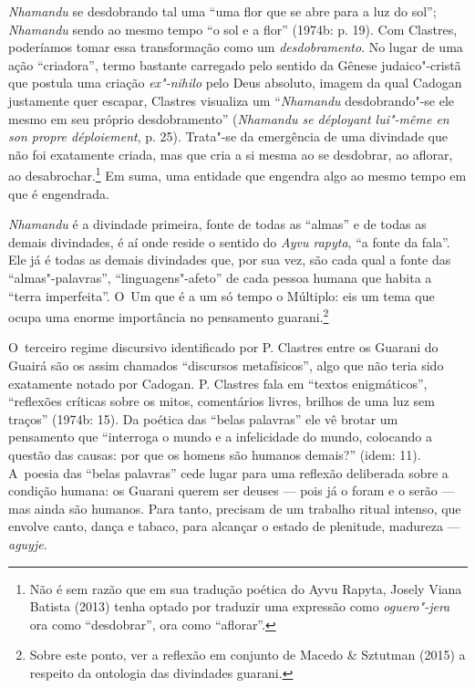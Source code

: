 \emph{Nhamandu} se desdobrando tal uma ``uma flor que se abre para a luz do
sol''; \emph{Nhamandu} sendo ao mesmo tempo ``o sol e a flor'' (1974b: p. 19).
Com Clastres, poderíamos tomar essa transformação como um
\emph{desdobramento}. No lugar de uma ação ``criadora'', termo bastante
carregado pelo sentido da Gênese judaico"-cristã que postula uma criação
\emph{ex"-nihilo} pelo Deus absoluto, imagem da qual Cadogan justamente
quer escapar, Clastres visualiza um ``\emph{Nhamandu} desdobrando"-se ele mesmo
em seu próprio desdobramento'' (\emph{Nhamandu se déployant lui"-même en son
propre déploiement}, p. 25). Trata"-se da emergência de uma divindade
que não foi exatamente criada, mas que cria a si mesma ao se desdobrar,
ao aflorar, ao desabrochar.\footnote{Não é sem razão que em sua
tradução poética do Ayvu Rapyta, Josely Viana Batista (2013) tenha
optado por traduzir uma expressão como \emph{oguero"-jera} ora como
``desdobrar'', ora como ``aflorar''.} Em suma, uma entidade que engendra
algo ao mesmo tempo em que é engendrada.

\emph{Nhamandu} é a divindade primeira, fonte de todas as ``almas'' e de todas as
demais divindades, é aí onde reside o sentido do \emph{Ayvu rapyta}, ``a fonte
da fala''. Ele já é todas as demais divindades que, por sua vez, são
cada qual a fonte das ``almas"-palavras'', ``linguagens"-afeto'' de cada
pessoa humana que habita a ``terra imperfeita''. O~Um que é a um só tempo
o Múltiplo: eis um tema que ocupa uma enorme importância no pensamento
guarani.\footnote{Sobre este ponto, ver a reflexão em conjunto de
Macedo \& Sztutman (2015) a respeito da ontologia das divindades
guarani.}

O~terceiro regime discursivo identificado por P. Clastres entre os
Guarani do Guairá são os assim chamados ``discursos metafísicos'', algo
que não teria sido exatamente notado por Cadogan. P. Clastres fala em
``textos enigmáticos'', ``reflexões críticas sobre os mitos, comentários
livres, brilhos de uma luz sem traços'' (1974b: 15). Da poética das
``belas palavras'' ele vê brotar um pensamento que ``interroga o mundo e a
infelicidade do mundo, colocando a questão das causas: por que os
homens são humanos demais?'' (idem: 11). A~poesia das ``belas palavras''
cede lugar para uma reflexão deliberada sobre a condição humana: os
Guarani querem ser deuses --- pois já o foram e o serão --- mas ainda são
humanos. Para tanto, precisam de um trabalho ritual intenso, que
envolve canto, dança e tabaco, para alcançar o estado de plenitude,
madureza --- \emph{aguyje}. 

